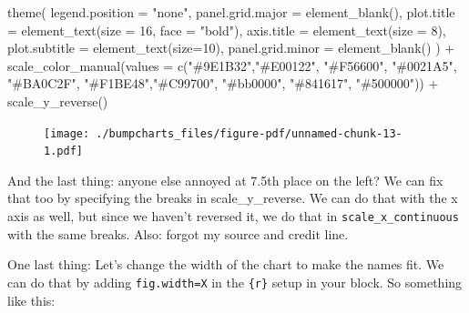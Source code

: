\documentclass[
  letterpaper,
  DIV=11,
  numbers=noendperiod]{scrreprt}
\newenvironment{Shaded}{\begin{snugshade}}{\end{snugshade}}
\newcommand{\AttributeTok}[1]{\textcolor[rgb]{0.40,0.45,0.13}{#1}}
\newcommand{\DecValTok}[1]{\textcolor[rgb]{0.68,0.00,0.00}{#1}}
\newcommand{\FunctionTok}[1]{\textcolor[rgb]{0.28,0.35,0.67}{#1}}
\newcommand{\NormalTok}[1]{\textcolor[rgb]{0.00,0.23,0.31}{#1}}
\newcommand{\SpecialCharTok}[1]{\textcolor[rgb]{0.37,0.37,0.37}{#1}}
\newcommand{\StringTok}[1]{\textcolor[rgb]{0.13,0.47,0.30}{#1}}
\begin{document}
\begin{Shaded}
\begin{Highlighting}[]
  \FunctionTok{theme}\NormalTok{(}
    \AttributeTok{legend.position =} \StringTok{"none"}\NormalTok{,}
    \AttributeTok{panel.grid.major =} \FunctionTok{element\_blank}\NormalTok{(),}
    \AttributeTok{plot.title =} \FunctionTok{element\_text}\NormalTok{(}\AttributeTok{size =} \DecValTok{16}\NormalTok{, }\AttributeTok{face =} \StringTok{"bold"}\NormalTok{),}
    \AttributeTok{axis.title =} \FunctionTok{element\_text}\NormalTok{(}\AttributeTok{size =} \DecValTok{8}\NormalTok{), }
    \AttributeTok{plot.subtitle =} \FunctionTok{element\_text}\NormalTok{(}\AttributeTok{size=}\DecValTok{10}\NormalTok{), }
    \AttributeTok{panel.grid.minor =} \FunctionTok{element\_blank}\NormalTok{()}
\NormalTok{    ) }\SpecialCharTok{+}
  \FunctionTok{scale\_color\_manual}\NormalTok{(}\AttributeTok{values =} \FunctionTok{c}\NormalTok{(}\StringTok{"\#9E1B32"}\NormalTok{,}\StringTok{"\#E00122"}\NormalTok{, }\StringTok{"\#F56600"}\NormalTok{, }\StringTok{"\#0021A5"}\NormalTok{, }\StringTok{"\#BA0C2F"}\NormalTok{, }\StringTok{"\#F1BE48"}\NormalTok{,}\StringTok{"\#C99700"}\NormalTok{, }\StringTok{"\#bb0000"}\NormalTok{, }\StringTok{"\#841617"}\NormalTok{, }\StringTok{"\#500000"}\NormalTok{)) }\SpecialCharTok{+}
  \FunctionTok{scale\_y\_reverse}\NormalTok{() }
\end{Highlighting}
\end{Shaded}

\begin{figure}[H]

{\centering \texttt{[image: ./bumpcharts\_files/figure-pdf/unnamed-chunk-13-1.pdf]}

}

\end{figure}

And the last thing: anyone else annoyed at 7.5th place on the left? We
can fix that too by specifying the breaks in scale\_y\_reverse. We can
do that with the x axis as well, but since we haven't reversed it, we do
that in \texttt{scale\_x\_continuous} with the same breaks. Also: forgot
my source and credit line.

One last thing: Let's change the width of the chart to make the names
fit. We can do that by adding \texttt{fig.width=X} in the \texttt{\{r\}}
setup in your block. So something like this:
\end{document}
